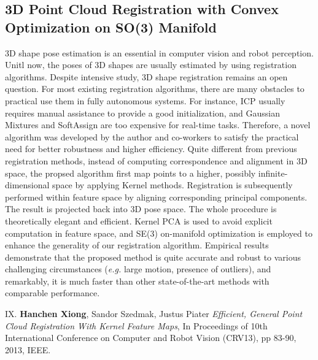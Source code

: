 \subsection{3D Point Cloud Registration with Convex Optimization on SO(3) Manifold}
3D shape pose estimation is an essential in computer vision and robot
perception.
Unitl now, the poses of 3D shapes are usually estimated by using registration algorithms. 
Despite intensive study, 3D shape
registration remains an open question. 
For most existing registration algorithms, there are many obstacles to
practical use them in fully autonomous systems. For instance, ICP usually
requires manual assistance to provide a good initialization, and
Gaussian Mixtures and SoftAssign are too expensive for real-time
tasks. Therefore, a novel algorithm was developed by the author and co-workers to satisfy the
practical need for better robustness and higher efficiency. Quite
different from previous registration methods, instead of computing
correspondence and alignment in 3D space, the propsed algorithm first map
points to a higher, possibly infinite-dimensional space by applying
Kernel methods. Registration is subsequently performed within feature
space by aligning corresponding principal components. The result is
projected back into 3D pose space. The whole procedure is
theoretically elegant and efficient. Kernel PCA is used to avoid
explicit computation in feature space, and SE(3) on-manifold
optimization is employed to enhance the generality of our registration algorithm. 
Empirical results demonstrate that the proposed method is quite accurate
and robust to various challenging circumstances (\emph{e.g.} large motion,
presence of outliers), and remarkably, it is much faster than other
state-of-the-art methods with comparable performance. 

\begin{shaded}
 {\Huge IX.} \textbf{Hanchen Xiong}, Sandor Szedmak, Justus Piater {\it Efficient, General Point Cloud Registration With Kernel Feature Maps}, 
In Proceedings of 10th International Conference on Computer and Robot Vision (CRV13), pp 83-90, 2013, IEEE.
\end{shaded}







